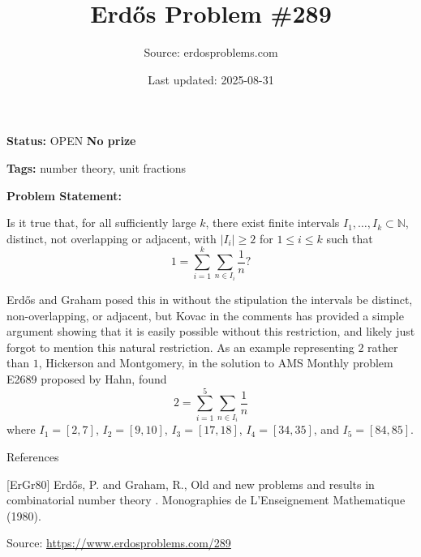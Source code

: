 \documentclass{article}
\title{Erd\H{o}s Problem \#289}
\date{Last updated: 2025-08-31}
\author{Source: erdosproblems.com}
\begin{document}
\maketitle

\noindent\textbf{Status:} OPEN \quad \textbf{No prize}

\noindent\textbf{Tags:} number theory, unit fractions

\medskip

\noindent\textbf{Problem Statement:}

Is it true that, for all sufficiently large $k$, there exist finite intervals $I_1,\ldots,I_k\subset \mathbb{N}$, distinct, not overlapping or adjacent, with $\lvert I_i\rvert \geq 2$ for $1\leq i\leq k$ such that\[1=\sum_{i=1}^k \sum_{n\in I_i}\frac{1}{n}?\]




Erd\H{o}s and Graham posed this in \cite{ErGr80} without the stipulation the intervals be distinct, non-overlapping, or adjacent, but Kovac in the comments has provided a simple argument showing that it is easily possible without this restriction, and likely \cite{ErGr80} just forgot to mention this natural restriction. As an example representing $2$ rather than $1$, Hickerson and Montgomery, in the solution to AMS Monthly problem E2689 proposed by Hahn, found\[2=\sum_{i=1}^5 \sum_{n\in I_i}\frac{1}{n}\]where $I_1=[2,7]$, $I_2=[9,10]$, $I_3=[17,18]$, $I_4=[34,35]$, and $I_5=[84,85]$.




References

[ErGr80] Erd\H{o}s, P. and Graham, R., Old and new problems and results in combinatorial number theory . Monographies de L'Enseignement Mathematique (1980).


\bigskip
\noindent\small{Source: \url{https://www.erdosproblems.com/289}}
\end{document}
